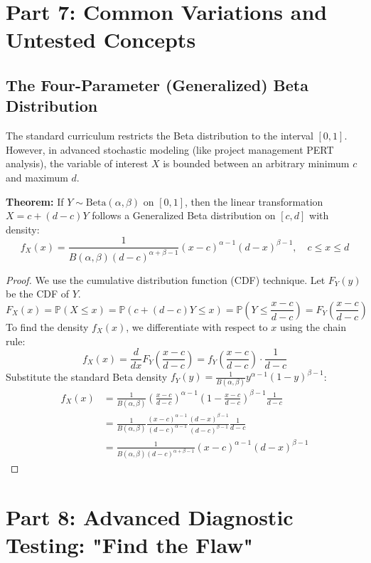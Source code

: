 \documentclass[11pt, a4paper]{article}
\theoremstyle{definition}
\theoremstyle{remark}
\newcommand{\Prob}{\mathbb{P}}
\begin{document}
\newpage
\section{Part 7: Common Variations and Untested Concepts}

\subsection{The Four-Parameter (Generalized) Beta Distribution}
The standard curriculum restricts the Beta distribution to the interval $[0,1]$. However, in advanced stochastic modeling (like project management PERT analysis), the variable of interest $X$ is bounded between an arbitrary minimum $c$ and maximum $d$. 

\textbf{Theorem:} If $Y \sim \text{Beta}(\alpha, \beta)$ on $[0,1]$, then the linear transformation $X = c + (d-c)Y$ follows a Generalized Beta distribution on $[c, d]$ with density:
\[
f_X(x) = \frac{1}{B(\alpha, \beta) (d-c)^{\alpha+\beta-1}} (x-c)^{\alpha-1}(d-x)^{\beta-1}, \quad c \le x \le d
\]

\begin{proof}
We use the cumulative distribution function (CDF) technique. Let $F_Y(y)$ be the CDF of $Y$.
\[
F_X(x) = \Prob(X \le x) = \Prob(c + (d-c)Y \le x) = \Prob\left(Y \le \frac{x-c}{d-c}\right) = F_Y\left(\frac{x-c}{d-c}\right)
\]
To find the density $f_X(x)$, we differentiate with respect to $x$ using the chain rule:
\[
f_X(x) = \frac{d}{dx} F_Y\left(\frac{x-c}{d-c}\right) = f_Y\left(\frac{x-c}{d-c}\right) \cdot \frac{1}{d-c}
\]
Substitute the standard Beta density $f_Y(y) = \frac{1}{B(\alpha, \beta)} y^{\alpha-1}(1-y)^{\beta-1}$:
\begin{align*}
f_X(x) &= \frac{1}{B(\alpha, \beta)} \left( \frac{x-c}{d-c} \right)^{\alpha-1} \left( 1 - \frac{x-c}{d-c} \right)^{\beta-1} \frac{1}{d-c} \\
&= \frac{1}{B(\alpha, \beta)} \frac{(x-c)^{\alpha-1}}{(d-c)^{\alpha-1}} \frac{(d-x)^{\beta-1}}{(d-c)^{\beta-1}} \frac{1}{d-c} \\
&= \frac{1}{B(\alpha, \beta) (d-c)^{\alpha+\beta-1}} (x-c)^{\alpha-1}(d-x)^{\beta-1}
\end{align*}
\end{proof}

\section{Part 8: Advanced Diagnostic Testing: "Find the Flaw"}
\end{document}

